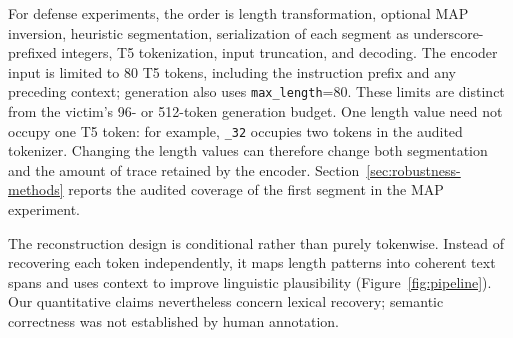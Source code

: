 \documentclass[electronics,article,submit,pdftex,moreauthors]{Definitions/mdpi}
\begin{document}
For defense experiments, the order is length transformation, optional MAP inversion, heuristic segmentation, serialization of each segment as underscore-prefixed integers, T5 tokenization, input truncation, and decoding. The encoder input is limited to 80 T5 tokens, including the instruction prefix and any preceding context; generation also uses \texttt{max\_length}=80. These limits are distinct from the victim's 96- or 512-token generation budget. One length value need not occupy one T5 token: for example, \texttt{\_32} occupies two tokens in the audited tokenizer. Changing the length values can therefore change both segmentation and the amount of trace retained by the encoder. Section~\ref{sec:robustness-methods} reports the audited coverage of the first segment in the MAP experiment.

The reconstruction design is conditional rather than purely tokenwise. Instead of recovering each token independently, it maps length patterns into coherent text spans and uses context to improve linguistic plausibility (Figure~\ref{fig:pipeline}). Our quantitative claims nevertheless concern lexical recovery; semantic correctness was not established by human annotation.
\end{document}
